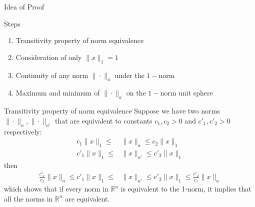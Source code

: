 \documentclass[10pt,appendixnumberbeamer]{beamer}
\begin{document}
%



\begin{frame}{Idea of Proof}
\begin{block}{Steps}
\begin{enumerate}[1.]
\item Transitivity property of norm equivalence
\item Consideration of only $\|x\|_1 = 1$
\item Continuity of any norm $\|\cdot\|_a$ under the $1-$norm
\item Maximum and minimum of $\|\cdot\|_a$ on the $1-$norm unit sphere
\end{enumerate}
\end{block}
\end{frame}


\begin{frame}{Transitivity property of norm equivalence}
Suppose we have two norms $\|\cdot\|_a, \|\cdot\|_{a'}$ that are equivalent to constants $c_1, c_2 >0$ and $c'_1, c'_2 >0$ respectively:
\begin{align*}
c_1 \|x\|_1\leq &\|x\|_a \leq c_2\|x\|_1\\
c'_1 \|x\|_1\leq &\|x\|_{a'} \leq c'_2\|x\|_1
\end{align*}
then
\begin{align*}
\frac{c'_1}{c_2} \|x\|_a \leq c'_1 \|x\|_1\leq &\|x\|_{a'} \leq c'_2\|x\|_1 \leq  \frac{c'_2}{c_1}\|x\|_a
\end{align*}
which shows that if every norm in $\mathbb{R}^n$ is equivalent to the 1-norm, it implies that all the norms in $\mathbb{R}^n$ are equivalent.

\end{frame}
\end{document}
